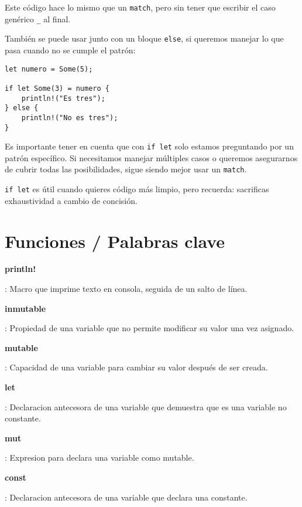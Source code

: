 \documentclass[12pt]{article}
\begin{document}
Este código hace lo mismo que un \texttt{match}, pero sin tener que escribir el caso genérico \texttt{\_} al final.

También se puede usar junto con un bloque \texttt{else}, si queremos manejar lo que pasa cuando no se cumple el patrón:

\begin{lstlisting}[style=ruststyle]
let numero = Some(5);

if let Some(3) = numero {
	println!("Es tres");
} else {
	println!("No es tres");
}
\end{lstlisting}

Es importante tener en cuenta que con \texttt{if let} solo estamos preguntando por un patrón específico. Si necesitamos manejar múltiples casos o queremos asegurarnos de cubrir todas las posibilidades, sigue siendo mejor usar un \texttt{match}.

\texttt{if let} es útil cuando quieres código más limpio, pero recuerda: sacrificas exhaustividad a cambio de concisión.


	\newpage
	\section*{Funciones / Palabras clave}
	\hypertarget{println}{\textbf{println!}}: Macro que imprime texto en consola, seguida de un salto de línea.


	\hypertarget{inmutable}{\textbf{inmutable}}: Propiedad de una variable que no permite modificar su valor una vez asignado.


	\hypertarget{mutable}{\textbf{mutable}}: Capacidad de una variable para cambiar su valor después de ser creada.

	\hypertarget{let}{\textbf{let}}: Declaracion antecesora de una variable que demuestra que es una variable no constante.


	\hypertarget{mut}{\textbf{mut}}: Expresion para declara una variable como mutable.


	\hypertarget{const}{\textbf{const}}: Declaracion antecesora de una variable que declara una constante.
\end{document}
